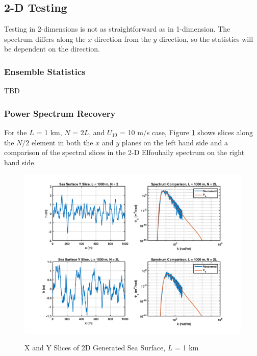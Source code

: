 \subsection{2-D Testing}
Testing in 2-dimensions is not as straightforward as in 1-dimension. The spectrum differs along the $x$ direction from the $y$ direction, so the statistics will be dependent on the direction.

\subsubsection{Ensemble Statistics}
TBD

\subsubsection{Power Spectrum Recovery}
For the $L$ = 1 km, $N$ = $2L$, and $U_{10}$ = 10 m/s case, Figure \ref{os_fig:10} shows slices along the $N/2$ element in both the $x$ and $y$ planes on the left hand side and a comparison of the spectral slices in the 2-D Elfouhaily spectrum on the right hand side. 
\begin{figure}[H]
  \begin{center}
\includegraphics[width=6in]{../media/Ocean_Surface/sea_surface_2d_slices_1000.png}
  \end{center}
  \renewcommand{\baselinestretch}{1} \small\normalsize
  \begin{quote}
    \caption[X and Y Slices of 2D Generated Sea Surface, $L$ = 1 km]{X and Y Slices of 2D Generated Sea Surface, $L$ = 1 km\label{os_fig:10}}
  \end{quote}
\end{figure}
\renewcommand{\baselinestretch}{2} \small\normalsize

